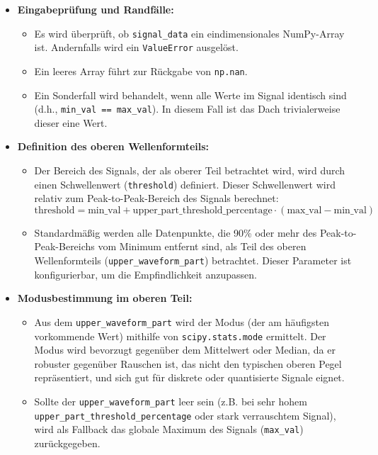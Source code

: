 \documentclass[a4paper, portrait, 12pt]{scrartcl} %
\begin{document}
\begin{itemize}
    \item \textbf{Eingabeprüfung und Randfälle:}
    \begin{itemize}
        \item Es wird überprüft, ob \texttt{signal\_data} ein eindimensionales NumPy-Array ist. Andernfalls wird ein \texttt{ValueError} ausgelöst.
        \item Ein leeres Array führt zur Rückgabe von \texttt{np.nan}.
        \item Ein Sonderfall wird behandelt, wenn alle Werte im Signal identisch sind (d.h., \texttt{min\_val == max\_val}). In diesem Fall ist das Dach trivialerweise dieser eine Wert.
    \end{itemize}

    \item \textbf{Definition des oberen Wellenformteils:}
    \begin{itemize}
        \item Der Bereich des Signals, der als oberer Teil betrachtet wird, wird durch einen Schwellenwert (\texttt{threshold}) definiert. Dieser Schwellenwert wird relativ zum Peak-to-Peak-Bereich des Signals berechnet:
        $$
        \text{threshold} = \text{min\_val} + \text{upper\_part\_threshold\_percentage} \cdot (\text{max\_val} - \text{min\_val})
        $$
        \item Standardmäßig werden alle Datenpunkte, die 90\% oder mehr des Peak-to-Peak-Bereichs vom Minimum entfernt sind, als Teil des oberen Wellenformteils (\texttt{upper\_waveform\_part}) betrachtet. Dieser Parameter ist konfigurierbar, um die Empfindlichkeit anzupassen.
    \end{itemize}

    \item \textbf{Modusbestimmung im oberen Teil:}
    \begin{itemize}
        \item Aus dem \texttt{upper\_waveform\_part} wird der Modus (der am häufigsten vorkommende Wert) mithilfe von \texttt{scipy.stats.mode} ermittelt. Der Modus wird bevorzugt gegenüber dem Mittelwert oder Median, da er robuster gegenüber Rauschen ist, das nicht den typischen oberen Pegel repräsentiert, und sich gut für diskrete oder quantisierte Signale eignet.
        \item Sollte der \texttt{upper\_waveform\_part} leer sein (z.B. bei sehr hohem \\\texttt{upper\_part\_threshold\_percentage} oder stark verrauschtem Signal), wird als Fallback das globale Maximum des Signals (\texttt{max\_val}) zurückgegeben.
    \end{itemize}


\end{itemize}
\end{document}
